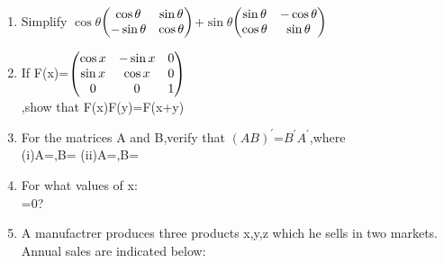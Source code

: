 \documentclass[journal,12pt,twocolumn]{IEEEtran}
\renewcommand\thesection{\arabic{section}}
\begin{document}
\begin{enumerate}[label=\thesection.\arabic*.,ref=\thesection.\theenumi]
\begin{enumerate}

\item {} \\
\end{enumerate}
\item Simplify $\cos\theta$$\begin{pmatrix} \cos\theta &\sin\theta\\ -\sin\theta &\cos\theta\end{pmatrix}$+$\sin\theta$$\begin{pmatrix} \sin\theta &-\cos\theta\\ \cos\theta &\sin\theta\end{pmatrix}$\\
\solution 

\item If F(x)=$\begin{pmatrix} \cos x &-\sin x &0\\ \sin x &\cos x &0\\0 &0 &1\end{pmatrix}$\\,show that F(x)F(y)=F(x+y)\\
\solution 


\item For the matrices A and B,verify that $(AB)^{'}$=$B^{'}A^{'}$,where\\
(i)A=,B= (ii)A=,B=

  \item For what values of x: \\=0?\\
\solution

  \item A manufactrer produces three products x,y,z which he sells in two markets. Annual sales are indicated below:\\
 

\end{enumerate}
\end{document}

